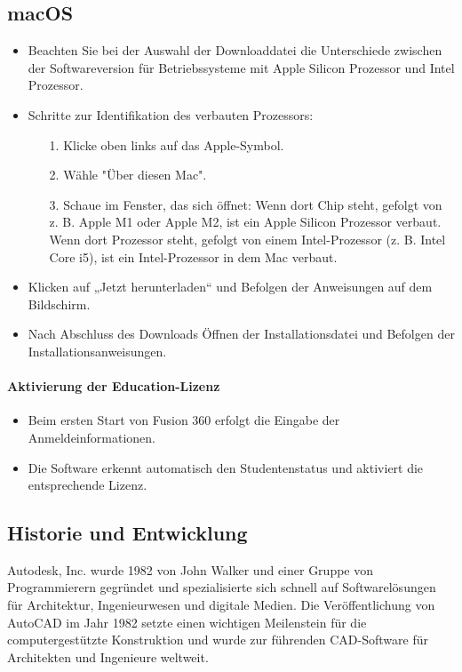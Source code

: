 \subsection*{macOS}
\begin{itemize}
	\item Beachten Sie bei der Auswahl der Downloaddatei die Unterschiede zwischen der Softwareversion für Betriebssysteme mit Apple Silicon Prozessor und Intel Prozessor.
	\item Schritte zur Identifikation des verbauten Prozessors:
	\begin{itemize}
		\item[1.] Klicke oben links auf das Apple-Symbol.
		\item[2.] Wähle "Über diesen Mac".
		\item[3.] Schaue im Fenster, das sich öffnet: \newline
		Wenn dort \glqq Chip\grqq {} steht, gefolgt von z. B. \glqq Apple M1\grqq {} oder \glqq Apple M2\grqq {}, ist ein Apple Silicon Prozessor verbaut.\newline
		Wenn dort \glqq Prozessor\grqq {} steht, gefolgt von einem Intel-Prozessor (z. B. \glqq Intel Core i5\grqq {}), ist ein Intel-Prozessor in dem Mac verbaut.
	\end{itemize}
	\item Klicken auf „Jetzt herunterladen“ und Befolgen der Anweisungen auf dem Bildschirm.
	\item Nach Abschluss des Downloads Öffnen der Installationsdatei und Befolgen der Installationsanweisungen.
\end{itemize}

\paragraph*{Aktivierung der Education-Lizenz}
\begin{itemize}
	\item Beim ersten Start von Fusion 360 erfolgt die Eingabe der Anmeldeinformationen.
	\item Die Software erkennt automatisch den Studentenstatus und aktiviert die entsprechende Lizenz.
\end{itemize}





\subsection{Historie und Entwicklung}
Autodesk, Inc. wurde 1982 von John Walker und einer Gruppe von Programmierern gegründet und spezialisierte sich schnell auf Softwarelösungen für Architektur, Ingenieurwesen und digitale Medien. \autocite{wikipedia_autodesk}
Die Veröffentlichung von AutoCAD im Jahr 1982 setzte einen wichtigen Meilenstein für die computergestützte Konstruktion und wurde zur führenden CAD-Software für Architekten und Ingenieure weltweit.\autocite{wikipedia_autocad_version_history}


